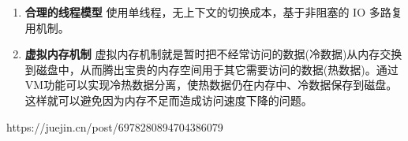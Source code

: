 \documentclass[../../../interview-questions.tex]{subfiles}
\begin{document}
\begin{enumerate}
    \item {\bf{合理的线程模型}} 使用单线程，无上下文的切换成本，基于非阻塞的 IO 多路复用机制。
    \item {\bf{虚拟内存机制}} 虚拟内存机制就是暂时把不经常访问的数据(冷数据)从内存交换到磁盘中，从而腾出宝贵的内存空间用于其它需要访问的数据(热数据)。通过VM功能可以实现冷热数据分离，使热数据仍在内存中、冷数据保存到磁盘。这样就可以避免因为内存不足而造成访问速度下降的问题。
\end{enumerate}

https://juejin.cn/post/6978280894704386079
\end{document}
